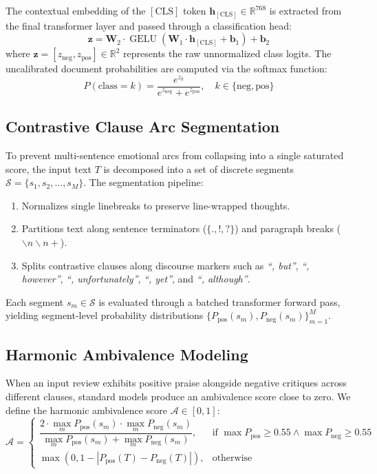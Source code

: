 \documentclass[conference]{IEEEtran}
\begin{document}
The contextual embedding of the $[\text{CLS}]$ token $\mathbf{h}_{[\text{CLS}]} \in \mathbb{R}^{768}$ is extracted from the final transformer layer and passed through a classification head:
\begin{equation}
\mathbf{z} = \mathbf{W}_2 \cdot \operatorname{GELU}(\mathbf{W}_1 \cdot \mathbf{h}_{[\text{CLS}]} + \mathbf{b}_1) + \mathbf{b}_2
\label{eq:logits}
\end{equation}
where $\mathbf{z} = [z_{\text{neg}}, z_{\text{pos}}] \in \mathbb{R}^2$ represents the raw unnormalized class logits. The uncalibrated document probabilities are computed via the softmax function:
\begin{equation}
P(\text{class} = k) = \frac{e^{z_k}}{e^{z_{\text{neg}}} + e^{z_{\text{pos}}}}, \quad k \in \{\text{neg}, \text{pos}\}
\end{equation}

\subsection{Contrastive Clause Arc Segmentation}
To prevent multi-sentence emotional arcs from collapsing into a single saturated score, the input text $T$ is decomposed into a set of discrete segments $\mathcal{S} = \{s_1, s_2, \dots, s_M\}$. The segmentation pipeline:
\begin{enumerate}
    \item Normalizes single linebreaks to preserve line-wrapped thoughts.
    \item Partitions text along sentence terminators ($\{., !, ?\}$) and paragraph breaks ($\backslash n\backslash n+$).
    \item Splits contrastive clauses along discourse markers such as \textit{``, but''}, \textit{``, however''}, \textit{``, unfortunately''}, \textit{``, yet''}, and \textit{``, although''}.
\end{enumerate}

Each segment $s_m \in \mathcal{S}$ is evaluated through a batched transformer forward pass, yielding segment-level probability distributions $\{P_{\text{pos}}(s_m), P_{\text{neg}}(s_m)\}_{m=1}^M$.

\subsection{Harmonic Ambivalence Modeling}
When an input review exhibits positive praise alongside negative critiques across different clauses, standard models produce an ambivalence score close to zero. We define the harmonic ambivalence score $\mathcal{A} \in [0, 1]$:
\begin{equation}
\mathcal{A} = 
\begin{cases} 
\dfrac{2 \cdot \max_{m} P_{\text{pos}}(s_m) \cdot \max_{m} P_{\text{neg}}(s_m)}{\max_{m} P_{\text{pos}}(s_m) + \max_{m} P_{\text{neg}}(s_m)}, & \text{if } \max P_{\text{pos}} \ge 0.55 \land \max P_{\text{neg}} \ge 0.55 \\
\max(0, 1 - |P_{\text{pos}}(T) - P_{\text{neg}}(T)|), & \text{otherwise}
\end{cases}
\end{equation}
\end{document}
